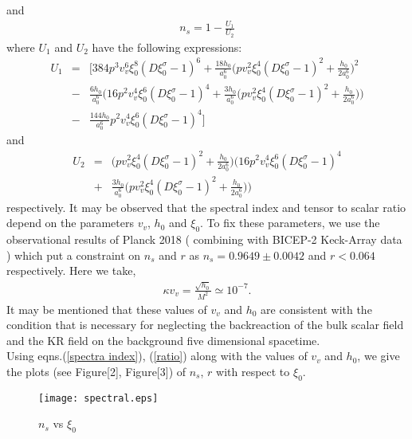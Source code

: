 \documentclass[a4paper]{article}
\begin{document}
and
\begin{eqnarray}
 n_s = 1 - \frac{U_1}{U_2}
 \label{spectra index}
\end{eqnarray}
where $U_1$ and $U_2$ have the following expressions:
\begin{eqnarray}
 U_1&=&\bigg[384p^3v_v^6\xi_0^8(D\xi_0^{\sigma}-1)^6 
 + \frac{18h_0}{a_0^6}\bigg(pv_v^2\xi_0^4(D\xi_0^{\sigma}-1)^2 + \frac{h_0}{2a_0^6}\bigg)^2\nonumber\\ 
 &-&\frac{6h_0}{a_0^6}\bigg(16p^2v_v^4\xi_0^6(D\xi_0^{\sigma}-1)^4 + \frac{3h_0}{a_0^6}
 \bigg(pv_v^2\xi_0^4(D\xi_0^{\sigma}-1)^2 + \frac{h_0}{2a_0^6}\bigg)\bigg)\nonumber\\
 &-&\frac{144h_0}{a_0^6}p^2v_v^4\xi_0^6(D\xi_0^{\sigma}-1)^4\bigg]
 \nonumber
\end{eqnarray}
and
\begin{eqnarray}
 U_2&=&\bigg(pv_v^2\xi_0^4(D\xi_0^{\sigma}-1)^2 + \frac{h_0}{2a_0^6}\bigg)\bigg(16p^2v_v^4\xi_0^6(D\xi_0^{\sigma}-1)^4\nonumber\\
 &+&\frac{3h_0}{a_0^6}\bigg(pv_v^2\xi_0^4(D\xi_0^{\sigma}-1)^2 + \frac{h_0}{2a_0^6}\bigg)\bigg)
 \nonumber
\end{eqnarray}
respectively. It may be observed that the spectral index and tensor to scalar ratio depend on the parameters $v_v$, $h_0$ and $\xi_0$. 
To fix these parameters, 
we use the observational results of Planck 2018 ( combining with 
BICEP-2 Keck-Array data ) \cite{Planck} which put a constraint on $n_s$ and $r$ as 
$n_s = 0.9649 \pm 0.0042$ and $r < 0.064$ respectively. Here we take,
\begin{eqnarray}
\kappa v_v = \frac{\sqrt{h_0}}{M^2} \simeq 10^{-7}.
\nonumber
\end{eqnarray}
It may be mentioned that these values of $v_v$ and $h_0$ are consistent with the condition that is necessary for neglecting the 
backreaction of the bulk scalar field and the KR field on the background five dimensional spacetime.\\
Using eqns.(\ref{spectra index}), (\ref{ratio}) along with the values of $v_v$ and $h_0$, 
we give the plots (see Figure[2], Figure[3]) of $n_s$, $r$ with respect to $\xi_0$.\\

\begin{figure}[!h]
\begin{center}
 \centering
 \texttt{[image: spectral.eps]}
 \caption{$n_s$ vs $\xi_0$}
 \label{plot spectral index}
\end{center}
\end{figure}
\end{document}

